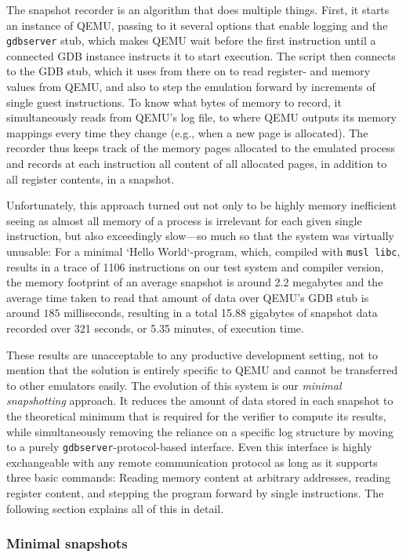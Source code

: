 The snapshot recorder is an algorithm that does multiple things. First, it starts an instance of QEMU, passing to it
several options that enable logging and the \texttt{gdbserver} stub, which makes QEMU wait before the first instruction
until a connected GDB instance instructs it to start execution. The script then connects to the GDB stub, which it uses
from there on to read register- and memory values from QEMU, and also to step the emulation forward by increments of
single guest instructions. To know what bytes of memory to record, it simultaneously reads from QEMU's log file, to
where QEMU outputs its memory mappings every time they change (e.g., when a new page is allocated). The recorder thus
keeps track of the memory pages allocated to the emulated process and records at each instruction all content of all
allocated pages, in addition to all register contents, in a snapshot.

Unfortunately, this approach turned out not only to be highly memory inefficient seeing as almost all memory of a
process is irrelevant for each given single instruction, but also exceedingly slow---so much so that the system was
virtually unusable: For a minimal `Hello World`-program, which, compiled with \texttt{musl libc}, results in a trace of
1106 instructions on our test system and compiler version, the memory footprint of an average snapshot is around 2.2
megabytes and the average time taken to read that amount of data over QEMU's GDB stub is around $185$ milliseconds,
resulting in a total 15.88 gigabytes of snapshot data recorded over 321 seconds, or 5.35 minutes, of execution time.

These results are unacceptable to any productive development setting, not to mention that the solution is entirely
specific to QEMU and cannot be transferred to other emulators easily. The evolution of this system is our
\textit{minimal snapshotting} approach. It reduces the amount of data stored in each snapshot to the theoretical minimum
that is required for the verifier to compute its results, while simultaneously removing the reliance on a specific log
structure by moving to a purely \texttt{gdbserver}-protocol-based interface. Even this interface is highly exchangeable
with any remote communication protocol as long as it supports three basic commands: Reading memory content at arbitrary
addresses, reading register content, and stepping the program forward by single instructions. The following section
explains all of this in detail.

\subsubsection{Minimal snapshots}\label{sec:minimal_snapshots}

